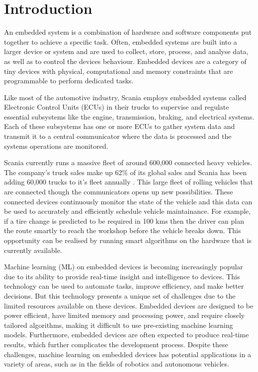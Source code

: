 \part{Introduction}

An embedded system is a combination of hardware and software components put together to achieve a specific task. Often, embedded systems are built into a larger device or system and are used to collect, store, process, and analyse data, as well as to control the device\textquotesingle s behaviour. Embedded devices are a category of tiny devices with physical, computational and memory constraints that are programmable to perform dedicated tasks.

Like most of the automotive industry, Scania employs embedded systems called Electronic Control Units (ECUs) in their trucks to supervise and regulate essential subsystems like the engine, transmission, braking, and electrical systems. Each of these subsystems has one or more ECUs to gather system data and transmit it to a central communicator where the data is processed and the systems operations are monitored.

Scania currently runs a massive fleet of around 600,000 connected heavy vehicles. The company's truck sales make up 62\% of its global sales and Scania has been adding 60,000 trucks to it's fleet annually \cite{scania-report}. This large fleet of rolling vehicles that are connected though the communicators opens up new possibilities. These connected devices continuously monitor the state of the vehicle and this data can be used to accurately
and efficiently schedule vehicle maintainance. For example, if a tire change is predicted to be required in 100 kms then the driver can plan the route smartly to reach the workshop before the vehicle breaks down. This opportunity can be realised by running smart algorithms on the hardware that is currently available.

Machine learning (ML) on embedded devices is becoming increasingly popular due to its ability to provide real-time insight and intelligence to devices. This technology can be used to automate tasks, improve efficiency, and make better decisions. But this technology presents a unique set of challenges due to the limited resources available on these devices. Embedded devices are designed to be power efficient, have limited memory and processing power, and require closely tailored algorithms, making it difficult to use pre-existing machine learning models. Furthermore, embedded devices are often expected to produce real-time results, which further complicates the development process. Despite these challenges, machine learning on embedded devices has potential applications in a variety of areas, such as in the fields of robotics and autonomous vehicles.

